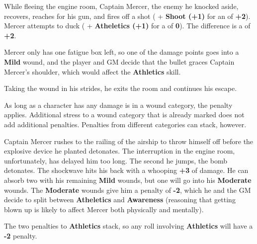\begin{WyrdExample}
	While fleeing the engine room, Captain Mercer, the enemy he knocked aside, recovers, reaches for his gun, and fires off a shot ( + \textbf{Shoot (+1)} for an \Attack of \textbf{+2}). Mercer attempts to duck ( + \textbf{Atheletics (+1)} for a \Defend of \textbf{0}). The difference is a \Damage of \textbf{+2}.
	
	Mercer only has one fatigue box left, so one of the damage points goes into a \textbf{Mild} wound, and the player and GM decide that the bullet graces Captain Mercer's shoulder, which would affect the \textbf{Athletics} skill.
	
	\vspace{0.5\baselineskip}
	\DamageBox[fatigue=4,mild=1,mildtext=\textbf{Athletics (-1)}]

	Taking the wound in his strides, he exits the room and continues his escape.
\end{WyrdExample}

As long as a character has any damage is in a wound category, the penalty applies. Additional stress to a wound category that is already marked does not add additional penalties. Penalties from different categories can stack, however.

\begin{WyrdExample}
	Captain Mercer rushes to the railing of the airship to throw himself off before the explosive device he planted detonates. The interruption in the engine room, unfortunately, has delayed him too long. The second he jumps, the bomb detonates. The shockwave hits his back with a whooping \textbf{+3} of damage. He can absorb two with his remaining \textbf{Mild} wounds, but one will go into his \textbf{Moderate} wounds. The \textbf{Moderate} wounds give him a penalty of \textbf{-2}, which he and the GM decide to split between \textbf{Atheletics} and \textbf{Awareness} (reasoning that getting blown up is likely to affect Mercer both physically and mentally).
	
	\vspace{0.5\baselineskip}
	\DamageBox[%
		fatigue=4,%
		mild=3,%
		mildtext=\textbf{Athletics (-1)},%
		moderate=1,%
		moderatetext=\textbf{Athletics (-1), Awareness (-1)}%
	]
	
	\noindent
	The two penalties to \textbf{Athletics} stack, so any roll involving \textbf{Athletics} will have a \textbf{-2} penalty.
\end{WyrdExample}

